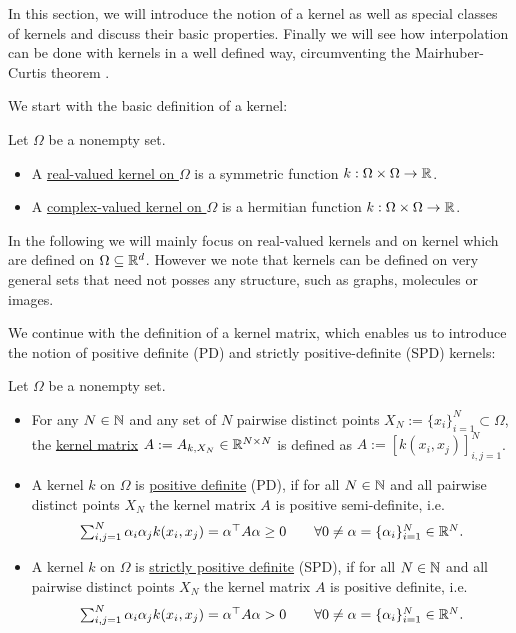 In this section, we will introduce the notion of a kernel as well as special classes of kernels 
and discuss their basic properties.
Finally we will see how interpolation can be done with kernels in a well defined way, circumventing the Mairhuber-Curtis theorem .

We start with the basic definition of a kernel:

\begin{definition}
\label{def:kernel}
Let $\Omega$ be a nonempty set. 
\begin{itemize}
\item A \underline{real-valued kernel on $\Omega$} is a symmetric function $k: \Omega \times \Omega \rightarrow \mathbb{R}$.
\item A \underline{complex-valued kernel on $\Omega$} is a hermitian function $k: \Omega \times \Omega \rightarrow \mathbb{R}$.
\end{itemize}
\end{definition}

In the following we will mainly focus on real-valued kernels and on kernel which are defined on $\Omega \subseteq \mathbb{R}^d$.
However we note that kernels can be defined on very general sets that need not posses any structure, such as graphs, molecules or images.

We continue with the definition of a kernel matrix, 
which enables us to introduce the notion of positive definite (PD) and strictly positive-definite (SPD) kernels:

\begin{definition}
\label{def:positive_def_kernels}
Let $\Omega$ be a nonempty set.
\begin{itemize}
\item For any $N \in \mathbb{N}$ and any set of $N$ pairwise distinct points $X_N := \{ x_i \}_{i=1}^N \subset \Omega$, the \underline{kernel matrix} $A := A_{k, X_N} \in \mathbb{R}^{N \times N}$ is defined as $A := [k(x_i, x_j)]_{i,j=1}^N$.
\item A kernel $k$ on $\Omega$ is \underline{positive definite} (PD), if for all $N \in \mathbb{N}$ and all pairwise distinct points $X_N$ the kernel matrix $A$ is positive semi-definite, i.e.\
\begin{align*}
\textstyle \sum_{i,j=1}^N \alpha_i \alpha_j k(x_i, x_j) = \alpha^\top A \alpha \geq 0 \qquad \forall 0 \neq \alpha = \{ \alpha_i \}_{i=1}^N \in \mathbb{R}^N.
\end{align*}
\item A kernel $k$ on $\Omega$ is \underline{strictly positive definite} (SPD), if for all $N \in \mathbb{N}$ and all pairwise distinct points $X_N$ the kernel matrix $A$ is positive definite, i.e.\
\begin{align*}
\textstyle \sum_{i,j=1}^N \alpha_i \alpha_j k(x_i, x_j) = \alpha^\top A \alpha > 0 \qquad \forall 0 \neq \alpha = \{ \alpha_i \}_{i=1}^N \in \mathbb{R}^N.
\end{align*} 
\end{itemize}
\end{definition}

